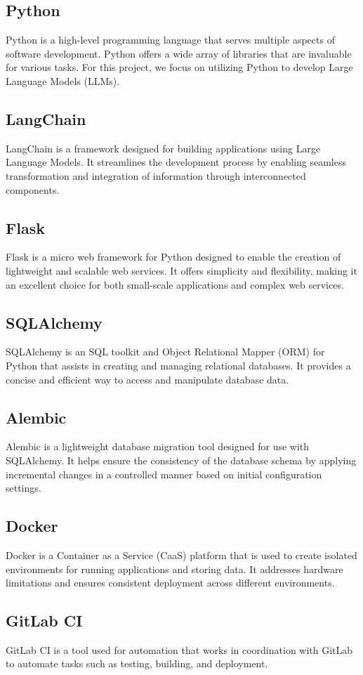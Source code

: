     \subsection{Python}
    Python is a high-level programming language that serves multiple aspects of software development. Python offers a wide array of libraries that are invaluable for various tasks. For this project, we focus on utilizing Python to develop Large Language Models (LLMs).
    \subsection{LangChain}
    LangChain is a framework designed for building applications using Large Language Models. It streamlines the development process by enabling seamless transformation and integration of information through interconnected components.
    \subsection{Flask}
    Flask is a micro web framework for Python designed to enable the creation of lightweight and scalable web services. It offers simplicity and flexibility, making it an excellent choice for both small-scale applications and complex web services.
    \subsection{SQLAlchemy}
    SQLAlchemy is an SQL toolkit and Object Relational Mapper (ORM) for Python that assists in creating and managing relational databases. It provides a concise and efficient way to access and manipulate database data.
    \subsection{Alembic}
    Alembic is a lightweight database migration tool designed for use with SQLAlchemy. It helps ensure the consistency of the database schema by applying incremental changes in a controlled manner based on initial configuration settings.
    \subsection{Docker}
    Docker is a Container as a Service (CaaS) platform that is used to create isolated environments for running applications and storing data. It addresses hardware limitations and ensures consistent deployment across different environments.
    \subsection{GitLab CI}
    GitLab CI is a tool used for automation that works in coordination with GitLab to automate tasks such as testing, building, and deployment.
